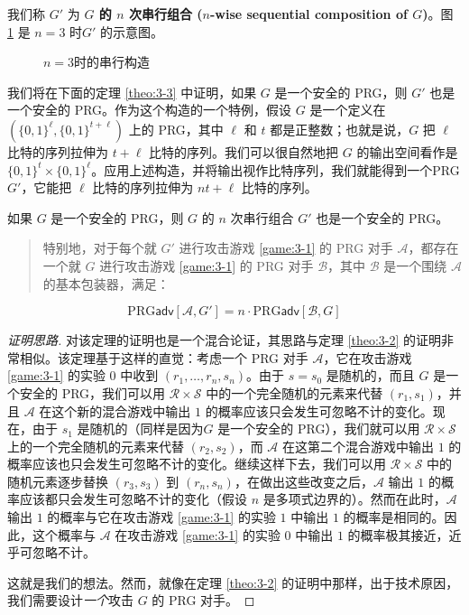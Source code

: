 \vspace*{10pt}

\noindent
我们称 $G'$ 为 \textbf{$G$ 的 $n$ 次串行组合 ($n$-wise sequential composition of $G$)}。图 \ref{fig:3-6} 是 $n=3$ 时$G'$ 的示意图。

\begin{figure}
	\centering
	
	\caption{$n=3$时的串行构造}
	\label{fig:3-6}
\end{figure}

我们将在下面的定理 \ref{theo:3-3} 中证明，如果 $G$ 是一个安全的 PRG，则 $G'$ 也是一个安全的 PRG。作为这个构造的一个特例，假设 $G$ 是一个定义在 $(\{0,1\}^\ell,\{0,1\}^{t+\ell})$ 上的 PRG，其中 $\ell$ 和 $t$ 都是正整数；也就是说，$G$ 把 $\ell$ 比特的序列拉伸为 $t+\ell$ 比特的序列。我们可以很自然地把 $G$ 的输出空间看作是 $\{0,1\}^t\times\{0,1\}^\ell$。应用上述构造，并将输出视作比特序列，我们就能得到一个PRG $G'$，它能把 $\ell$ 比特的序列拉伸为 $nt+\ell$ 比特的序列。

\begin{theorem}\label{theo:3-3}
如果 $G$ 是一个安全的 PRG，则 $G$ 的 $n$ 次串行组合 $G'$ 也是一个安全的 PRG。
\begin{quote}
特别地，对于每个就 $G'$ 进行攻击游戏 \ref{game:3-1} 的 PRG 对手 $\mathcal A$，都存在一个就 $G$ 进行攻击游戏 \ref{game:3-1} 的 PRG 对手 $\mathcal B$，其中 $\mathcal B$ 是一个围绕 $\mathcal A$ 的基本包装器，满足：
\end{quote}
\[
\mathrm{PRG}\mathsf{adv}[\mathcal{A},G']
=n\cdot
\mathrm{PRG}\mathsf{adv}[\mathcal{B},G]
\]
\end{theorem}

\begin{proof}[证明思路]
对该定理的证明也是一个混合论证，其思路与定理 \ref{theo:3-2} 的证明非常相似。该定理基于这样的直觉：考虑一个 PRG 对手 $\mathcal A$，它在攻击游戏 \ref{game:3-1} 的实验 $0$ 中收到 $(r_1,\dots,r_n,s_n)$。由于 $s=s_0$ 是随机的，而且 $G$ 是一个安全的 PRG，我们可以用 $\mathcal{R}\times\mathcal{S}$ 中的一个完全随机的元素来代替 $(r_1,s_1)$，并且 $\mathcal A$ 在这个新的混合游戏中输出 $1$ 的概率应该只会发生可忽略不计的变化。现在，由于 $s_1$ 是随机的（同样是因为$G$ 是一个安全的 PRG），我们就可以用 $\mathcal{R}\times\mathcal{S}$ 上的一个完全随机的元素来代替 $(r_2,s_2)$，而 $\mathcal A$ 在这第二个混合游戏中输出 $1$ 的概率应该也只会发生可忽略不计的变化。继续这样下去，我们可以用 $\mathcal{R}\times\mathcal{S}$ 中的随机元素逐步替换 $(r_3,s_3)$ 到 $(r_n,s_n)$，在做出这些改变之后，$\mathcal A$ 输出 $1$ 的概率应该都只会发生可忽略不计的变化（假设 $n$ 是多项式边界的）。然而在此时，$\mathcal A$ 输出 $1$ 的概率与它在攻击游戏 \ref{game:3-1} 的实验 $1$ 中输出 $1$ 的概率是相同的。因此，这个概率与 $\mathcal A$ 在攻击游戏 \ref{game:3-1} 的实验 $0$ 中输出 $1$ 的概率极其接近，近乎可忽略不计。

这就是我们的想法。然而，就像在定理 \ref{theo:3-2} 的证明中那样，出于技术原因，我们需要设计\emph{一个}攻击 $G$ 的 PRG 对手。
\end{proof}

